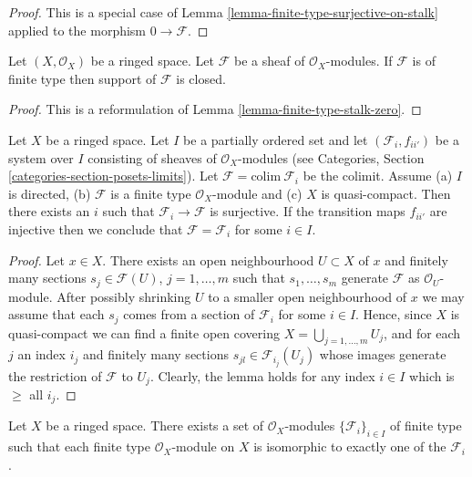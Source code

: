 \begin{proof}
This is a special case of
Lemma \ref{lemma-finite-type-surjective-on-stalk}
applied to the morphism $0 \to \mathcal{F}$.
\end{proof}

\begin{lemma}
\label{lemma-support-finite-type-closed}
Let $(X, \mathcal{O}_X)$ be a ringed space.
Let $\mathcal{F}$ be a sheaf of $\mathcal{O}_X$-modules.
If $\mathcal{F}$ is of finite type then support of $\mathcal{F}$ is closed.
\end{lemma}

\begin{proof}
This is a reformulation of Lemma \ref{lemma-finite-type-stalk-zero}.
\end{proof}

\begin{lemma}
\label{lemma-finite-type-quasi-compact-colimit}
Let $X$ be a ringed space.
Let $I$ be a partially ordered set and
let $(\mathcal{F}_i, f_{ii'})$ be a system over $I$
consisting of sheaves of $\mathcal{O}_X$-modules
(see Categories, Section \ref{categories-section-posets-limits}).
Let $\mathcal{F} = \text{colim}\ \mathcal{F}_i$
be the colimit. Assume (a) $I$ is directed, (b) $\mathcal{F}$
is a finite type $\mathcal{O}_X$-module and (c) $X$ is quasi-compact.
Then there exists an $i$ such that $\mathcal{F}_i \to \mathcal{F}$
is surjective. If the transition maps $f_{ii'}$ are injective
then we conclude that $\mathcal{F} = \mathcal{F}_i$ for some $i \in I$.
\end{lemma}

\begin{proof}
Let $x \in X$. There exists an open neighbourhood
$U \subset X$ of $x$ and finitely many sections
$s_j \in \mathcal{F}(U)$, $j = 1, \ldots, m$ such that
$s_1, \ldots, s_m$ generate $\mathcal{F}$ as $\mathcal{O}_U$-module.
After possibly shrinking $U$ to a smaller open neighbourhood of $x$
we may assume that each $s_j$ comes from a section of $\mathcal{F}_i$
for some $i \in I$.
Hence, since $X$ is quasi-compact we can find a finite open
covering $X = \bigcup_{j = 1, \ldots, m} U_j$, and for each $j$
an index $i_j$ and finitely many sections $s_{jl} \in \mathcal{F}_{i_j}(U_j)$
whose images generate the restriction of $\mathcal{F}$ to
$U_j$. Clearly, the lemma holds for any index $i \in I$ which
is $\geq$ all $i_j$.
\end{proof}

\begin{lemma}
\label{lemma-set-isomorphism-classes-finite-type-modules}
Let $X$ be a ringed space.
There exists a set of $\mathcal{O}_X$-modules
$\{\mathcal{F}_i\}_{i \in I}$ of finite type
such that each finite type $\mathcal{O}_X$-module
on $X$ is isomorphic to exactly one of the $\mathcal{F}_i$.
\end{lemma}

